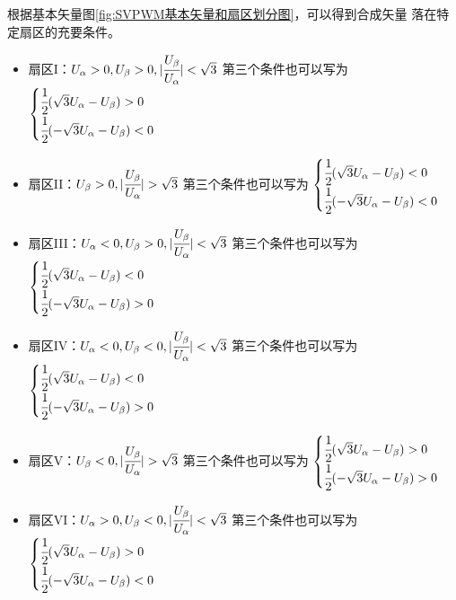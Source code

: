 根据基本矢量图\ref{fig:SVPWM基本矢量和扇区划分图}，可以得到合成矢量
落在特定扇区的充要条件。
\begin{itemize}
    \item 
    扇区I：\(U_{\mathrm{\alpha}}>0,{U_{\mathrm{\beta}}>0},
    |\cfrac{U_{\mathrm{\beta}}}{U_{\mathrm{\alpha}}}|<\sqrt 3\)
    第三个条件也可以写为
    \(\begin{cases}\cfrac 12(\sqrt{3}U_{\mathrm{\alpha}}-U_{\mathrm{\beta}})>0\\
        \cfrac 12(-\sqrt{3}U_{\mathrm{\alpha}}-U_{\mathrm{\beta}})<0\end{cases}\)
    \item 
    扇区II：\({U_{\mathrm{\beta}}>0},|\cfrac{U_{\mathrm{\beta}}}{U_{\mathrm{\alpha}}}|>\sqrt 3\)
    第三个条件也可以写为
    \(\begin{cases}\cfrac 12(\sqrt{3}U_{\mathrm{\alpha}}-U_{\mathrm{\beta}})<0\\
        \cfrac 12(-\sqrt{3}U_{\mathrm{\alpha}}-U_{\mathrm{\beta}})<0\end{cases}\)
    \item 
    扇区III：\(U_{\mathrm{\alpha}}<0,{U_{\mathrm{\beta}}>0},
    |\cfrac{U_{\mathrm{\beta}}}{U_{\mathrm{\alpha}}}|<\sqrt 3\)
    第三个条件也可以写为
    \(\begin{cases}\cfrac 12(\sqrt{3}U_{\mathrm{\alpha}}-U_{\mathrm{\beta}})<0\\
        \cfrac 12(-\sqrt{3}U_{\mathrm{\alpha}}-U_{\mathrm{\beta}})>0\end{cases}\)
    \item 
    扇区IV：\(U_{\mathrm{\alpha}}<0,{U_{\mathrm{\beta}}<0},
    |\cfrac{U_{\mathrm{\beta}}}{U_{\mathrm{\alpha}}}|<\sqrt 3\)
    第三个条件也可以写为
    \(\begin{cases}\cfrac 12(\sqrt{3}U_{\mathrm{\alpha}}-U_{\mathrm{\beta}})<0\\
        \cfrac 12(-\sqrt{3}U_{\mathrm{\alpha}}-U_{\mathrm{\beta}})>0\end{cases}\)
    \item 
    扇区V：\({U_{\mathrm{\beta}}<0},|\cfrac{U_{\mathrm{\beta}}}{U_{\mathrm{\alpha}}}|>\sqrt 3\)
    第三个条件也可以写为
    \(\begin{cases}\cfrac 12(\sqrt{3}U_{\mathrm{\alpha}}-U_{\mathrm{\beta}})>0\\
        \cfrac 12(-\sqrt{3}U_{\mathrm{\alpha}}-U_{\mathrm{\beta}})>0\end{cases}\)
    \item 
    扇区VI：\(U_{\mathrm{\alpha}}>0,{U_{\mathrm{\beta}}<0},
    |\cfrac{U_{\mathrm{\beta}}}{U_{\mathrm{\alpha}}}|<\sqrt 3\)
    第三个条件也可以写为
    \(\begin{cases}\cfrac 12(\sqrt{3}U_{\mathrm{\alpha}}-U_{\mathrm{\beta}})>0\\
        \cfrac 12(-\sqrt{3}U_{\mathrm{\alpha}}-U_{\mathrm{\beta}})<0\end{cases}\)
\end{itemize}

